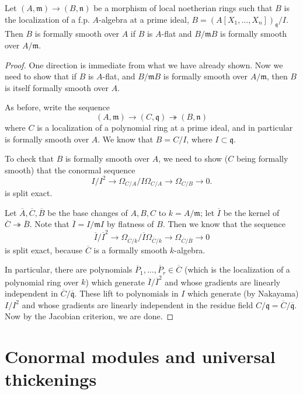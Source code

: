 \begin{theorem} 
Let $(A, \mathfrak{m}) \to (B, \mathfrak{n})$ be a morphism of local
noetherian rings such that $B$ is the localization of a f.p. $A$-algebra at a prime
ideal, $B = (A[X_1, \dots, X_n])_{\mathfrak{q}}/I$. Then $B$ is formally
smooth over $A$ if $B$ is $A$-flat and $B/\mathfrak{m}B$ is formally smooth
over $A/\mathfrak{m}$.
\end{theorem} 

\begin{proof} 
One direction is immediate from what we have already shown. Now we need to
show that if $B$ is $A$-flat, and $B/\mathfrak{m}B$ is formally smooth over
$A/\mathfrak{m}$, then $B$ is itself formally smooth over $A$.

As before, write the sequence
\[ (A, \mathfrak{m}) \to (C, \mathfrak{q}) \twoheadrightarrow (B,\mathfrak{n})
\]
where $C$ is a localization of a polynomial ring at a prime ideal, and in
particular is formally smooth over $A$. 
We know that $B = C/I$, where $I \subset \mathfrak{q}$.

To check that $B$ is formally smooth over $A$, we need to show ($C$ being
formally smooth) that the conormal sequence
\[ I/I^2 \to  \Omega_{C/A} / I \Omega_{C/A} \to \Omega_{C/B} \to 0. \]
is split exact. 

Let $\overline{A}, \overline{C}, \overline{B}$ be the base changes of $A, B,
C$ to $k = A/\mathfrak{m}$; let $\overline{I}$ be the kernel of $\overline{C}
\twoheadrightarrow \overline{B}$.
Note that $\overline{I} = I/\mathfrak{m}I$ by flatness of $B$.
Then we know that the sequence
\[ \overline{I}/\overline{I}^2 \to  \Omega_{\overline{C}/k} / \overline{I}
\Omega_{\overline{C}/k} \to \Omega_{\overline{C}/\overline{B}} \to 0\]
is split exact, because $\overline{C}$ is a formally smooth $k$-algebra.

In particular, there are polynomials $\overline{P}_1, \dots, \overline{P}_r
\in \overline{C}$ (which is the localization of a polynomial ring over $k$)
which generate $\overline{I}/\overline{I}^2$ and
whose gradients are linearly independent in
$\overline{C}/\mathfrak{\overline{q}}$. These lift to polynomials in $I$
which generate (by Nakayama) $I/I^2$ and whose gradients are linearly
independent in the residue field $C/\mathfrak{q} =
\overline{C}/\overline{\mathfrak{q}}$.
Now by the Jacobian criterion, we are done.
\end{proof} 


\section{Conormal modules and universal thickenings}
\label{section-conormal}

